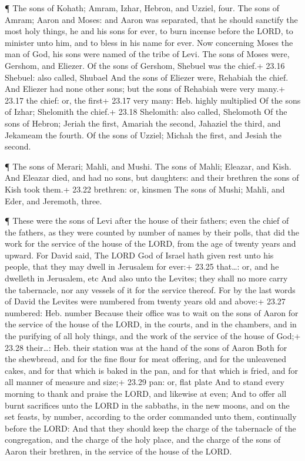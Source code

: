  ¶ The sons of Kohath; Amram, Izhar, Hebron, and Uzziel,
four.  The sons of Amram; Aaron and Moses: and Aaron was
separated, that he should sanctify the most holy things, he and his sons
for ever, to burn incense before the LORD, to minister unto him, and to
bless in his name for ever.  Now concerning Moses the man
of God, his sons were named of the tribe of Levi.  The sons
of Moses were, Gershom, and Eliezer.  Of the sons of
Gershom, Shebuel was the chief.+ 23.16 Shebuel: also called, Shubael
 And the sons of Eliezer were, Rehabiah the chief. And
Eliezer had none other sons; but the sons of Rehabiah were very many.+
23.17 the chief: or, the first+ 23.17 very many: Heb. highly multiplied
 Of the sons of Izhar; Shelomith the chief.+ 23.18
Shelomith: also called, Shelomoth  Of the sons of Hebron;
Jeriah the first, Amariah the second, Jahaziel the third, and Jekameam
the fourth.  Of the sons of Uzziel; Michah the first, and
Jesiah the second.

 ¶ The sons of Merari; Mahli, and Mushi. The sons of Mahli;
Eleazar, and Kish.  And Eleazar died, and had no sons, but
daughters: and their brethren the sons of Kish took them.+ 23.22
brethren: or, kinsmen  The sons of Mushi; Mahli, and Eder,
and Jeremoth, three.

 ¶ These were the sons of Levi after the house of their
fathers; even the chief of the fathers, as they were counted by number
of names by their polls, that did the work for the service of the house
of the LORD, from the age of twenty years and upward.  For
David said, The LORD God of Israel hath given rest unto his people, that
they may dwell in Jerusalem for ever:+ 23.25 that\ldots: or, and he
dwelleth in Jerusalem, etc  And also unto the Levites; they
shall no more carry the tabernacle, nor any vessels of it for the
service thereof.  For by the last words of David the
Levites were numbered from twenty years old and above:+ 23.27 numbered:
Heb. number  Because their office was to wait on the sons
of Aaron for the service of the house of the LORD, in the courts, and in
the chambers, and in the purifying of all holy things, and the work of
the service of the house of God;+ 23.28 their\ldots: Heb. their station
was at the hand of the sons of Aaron  Both for the
shewbread, and for the fine flour for meat offering, and for the
unleavened cakes, and for that which is baked in the pan, and for that
which is fried, and for all manner of measure and size;+ 23.29 pan: or,
flat plate  And to stand every morning to thank and praise
the LORD, and likewise at even;  And to offer all burnt
sacrifices unto the LORD in the sabbaths, in the new moons, and on the
set feasts, by number, according to the order commanded unto them,
continually before the LORD:  And that they should keep the
charge of the tabernacle of the congregation, and the charge of the holy
place, and the charge of the sons of Aaron their brethren, in the
service of the house of the LORD.


